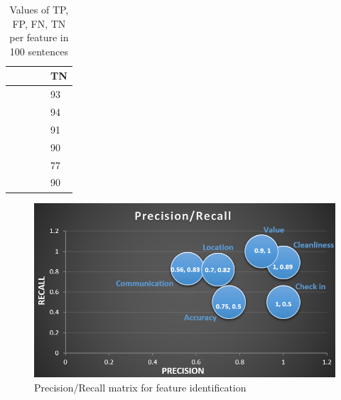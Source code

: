 \begin{table}[h!]
\footnotesize 
\centering
\begin{tabular}{|m{2.1cm}|m{2.4cm}|m{2.6cm}|m{1.8cm}|m{1.8cm}|}

\hline
\centering {\textbf{FEATURE}}  & \centering {\textbf{TP }} & \centering {\textbf{FP}} &  \centering{\textbf{FN}}  & {\textbf{TN}} \\

\hline
\centering {Accuracy}  & \centering {3} & \centering {1} &   \centering{3} &  {93}\\ \hline

 \centering {Check-in} & \centering {3} & \centering  {0} &  \centering {-3}&  {94}\\ \hline
 
 \centering {Cleanliness} & \centering {8} & \centering {0} &  \centering{1} &  {91}\\ \hline
 
\centering  {Communication} & \centering {5} & \centering {4} &  \centering{1} &  {90} \\ \hline

\centering {Location} & \centering {14} & \centering {6} &  \centering{3}&  {77}\\ \hline

\centering {Value} & \centering {9} & \centering {1} &  \centering{0} &  {90}\\ \hline
\end{tabular}
\caption{Values of TP, FP, FN, TN per feature in 100 sentences}
\label{res4}
\end{table}
\begin{figure}[h!]
	\centering
	\includegraphics[height=0.3\textheight]{precision_recall_1}
	\caption{Precision/Recall matrix for feature identification}
	\label{fig:matrix}
\end{figure}